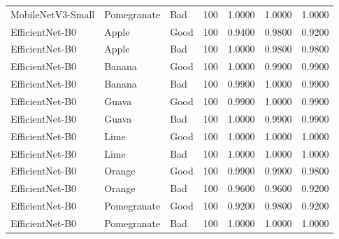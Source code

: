 \begin{tabular}{lllrrrr}
MobileNetV3-Small & Pomegranate & Bad & 100 & 1.0000 & 1.0000 & 1.0000 \\
EfficientNet-B0 & Apple & Good & 100 & 0.9400 & 0.9800 & 0.9200 \\
EfficientNet-B0 & Apple & Bad & 100 & 1.0000 & 0.9800 & 0.9800 \\
EfficientNet-B0 & Banana & Good & 100 & 1.0000 & 0.9900 & 0.9900 \\
EfficientNet-B0 & Banana & Bad & 100 & 0.9900 & 1.0000 & 0.9900 \\
EfficientNet-B0 & Guava & Good & 100 & 0.9900 & 1.0000 & 0.9900 \\
EfficientNet-B0 & Guava & Bad & 100 & 1.0000 & 0.9900 & 0.9900 \\
EfficientNet-B0 & Lime & Good & 100 & 1.0000 & 1.0000 & 1.0000 \\
EfficientNet-B0 & Lime & Bad & 100 & 1.0000 & 1.0000 & 1.0000 \\
EfficientNet-B0 & Orange & Good & 100 & 0.9900 & 0.9900 & 0.9800 \\
EfficientNet-B0 & Orange & Bad & 100 & 0.9600 & 0.9600 & 0.9200 \\
EfficientNet-B0 & Pomegranate & Good & 100 & 0.9200 & 0.9800 & 0.9200 \\
EfficientNet-B0 & Pomegranate & Bad & 100 & 1.0000 & 1.0000 & 1.0000 \\
\bottomrule
\end{tabular}

